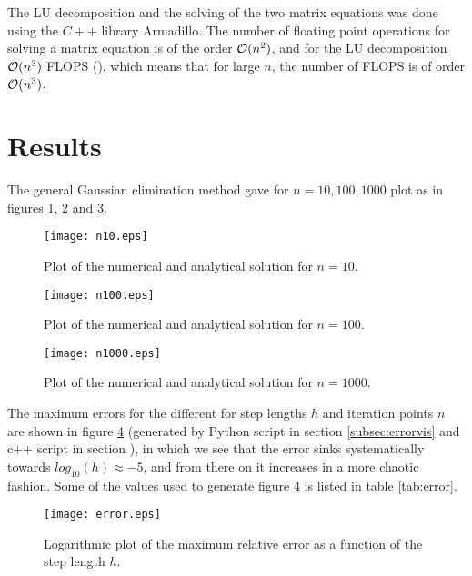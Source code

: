 \documentclass[norsk,a4paper,12pt]{article}
\begin{document}
The LU decomposition and the solving of the two matrix equations was done using the $C++$ library Armadillo. The number of floating point operations for solving a matrix equation is of the order ${\cal O}(n^2)$, and for the LU decomposition ${\cal O}(n^3)$ FLOPS (\cite[p. 173]{MHJ15}), which means that for large $n$, the number of FLOPS is of order ${\cal O}(n^3)$. 
\section{Results}
The general Gaussian elimination method gave for $n=10,100,1000$ plot as in figures \ref{fig:n=10}, \ref{fig:n=100} and \ref{fig:n=1000}.
\begin{figure}[h!]
\begin{center}
\texttt{[image: n10.eps]}
\caption{Plot of the numerical and analytical solution for $n=10$.}
\label{fig:n=10}
\end{center}
\end{figure}
\begin{figure}[h!]
\begin{center}
\texttt{[image: n100.eps]}
\caption{Plot of the numerical and analytical solution for $n=100$.}
\label{fig:n=100}
\end{center}
\end{figure}
\begin{figure}[h!]
\begin{center}
\texttt{[image: n1000.eps]}
\caption{Plot of the numerical and analytical solution for $n=1000$.}
\label{fig:n=1000}
\end{center}
\end{figure}
The maximum errors for the different for step lengths $h$ and iteration points $n$ are shown in figure \ref{fig:error} (generated by Python script in section \ref{subsec:errorvis} and c++ script in section ), in which we see that the error sinks systematically towards $log_{10}(h)\approx -5$, and from there on it increases in a more chaotic fashion. Some of the values used to generate figure \ref{fig:error} is listed in table \ref{tab:error}.
\begin{figure}[h!]
\begin{center}
\texttt{[image: error.eps]}
\caption{Logarithmic plot of the maximum relative error as a function of the step length $h$.}
\label{fig:error}
\end{center}
\end{figure}
\end{document}
